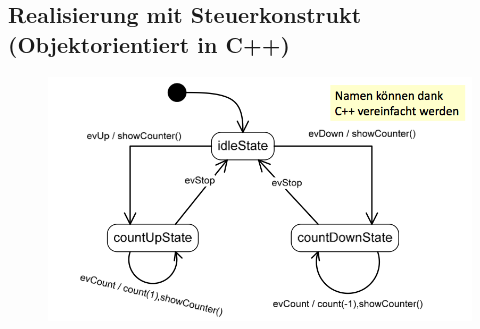 \subsection{Realisierung mit Steuerkonstrukt (Objektorientiert in
C++)}

\begin{figure}[h]
  \centering
  \includegraphics[scale = 0.45]{images/FSM/Up_down_counter_obj}  
\end{figure}

